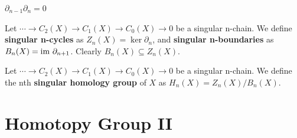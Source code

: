 \documentclass[12pt]{book}
\begin{document}
\begin{theorem}
	$\partial_{n-1}\partial_n=0$
\end{theorem}

\begin{definition}
	Let $\cdots\rightarrow C_2(X)\rightarrow C_1(X)\rightarrow C_0(X)\rightarrow 0$ be a singular n-chain. We define {\bf singular n-cycles} as $Z_n(X)=\ker \partial_n$, and {\bf singular n-boundaries} as $B_n(X)={\rm im\ } \partial_{n+1}$. Clearly $B_n(X)\subseteq Z_n(X)$.
\end{definition}

\begin{definition}
	Let $\cdots\rightarrow C_2(X)\rightarrow C_1(X)\rightarrow C_0(X)\rightarrow 0$ be a singular n-chain. We define the nth {\bf singular homology group} of $X$ as $H_n(X)=Z_n(X)/B_n(X)$.
\end{definition}

\part{Homotopy Group II}

%
%
\end{document}
